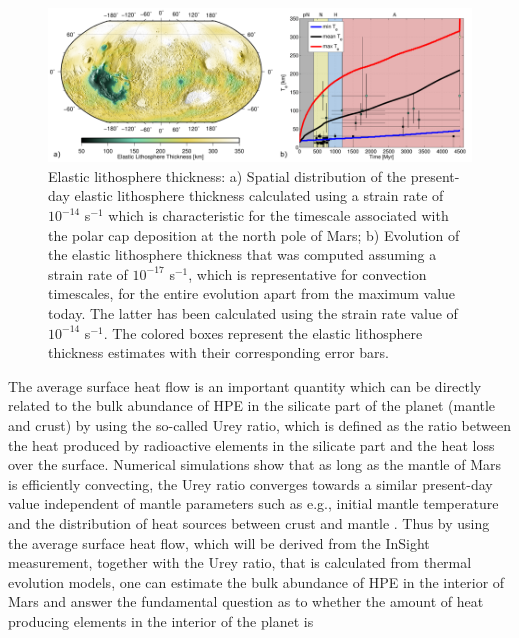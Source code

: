 \begin{figure}[h!]
\begin{center}
\includegraphics[width=\textwidth]
{figures/Fig3.png}
\caption{Elastic lithosphere thickness: a) Spatial distribution of the present-day elastic lithosphere thickness calculated using a strain rate of $10^{-14}$ s$^{-1}$ which is characteristic for the timescale associated with the polar cap deposition at the north pole of Mars; b) Evolution of the elastic lithosphere thickness that was computed assuming a strain rate of $10^{-17}$ s$^{-1}$, which is representative for convection timescales, for the entire evolution apart from the maximum value today. The latter has been calculated using the strain rate value of $10^{-14}$ s$^{-1}$. The colored boxes represent the elastic lithosphere thickness estimates with their corresponding error bars.}
\label{fig:Fig3.png} 
\end{center}
\end{figure}

The average surface heat flow is an important quantity which can be directly related to the bulk abundance of HPE in the silicate part of the planet (mantle and crust) by using the so-called Urey ratio, which is defined as the ratio between the heat produced by radioactive elements in the silicate part and the heat loss over the surface. Numerical simulations show that as long as the mantle of Mars is efficiently convecting, the Urey ratio converges towards a similar present-day value independent of mantle parameters such as e.g., initial mantle temperature and the distribution of heat sources between crust and mantle \citep{Grott2012a, Plesa2015}. Thus by using the average surface heat flow, which will be derived from the InSight measurement, together with the Urey ratio, that is calculated from thermal evolution models, one can estimate the bulk abundance of HPE in the interior of Mars and answer the fundamental question as to whether the amount of heat producing elements in the interior of the planet is 

